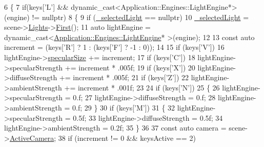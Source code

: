 \begin{DoxyCode}
6 \{
7     \textcolor{keywordflow}{if}(keys[\textcolor{charliteral}{'L'}] && dynamic\_cast<Application::Engines::LightEngine*>(engine) != \textcolor{keyword}{nullptr})
8     \{
9         \textcolor{keywordflow}{if} (\mbox{\hyperlink{classApplication_1_1Input_1_1Handlers_1_1LightingChangeInputHandler_a9d2d27b234fd09b3add304963534b719}{\_selectedLight}} == \textcolor{keyword}{nullptr})
10             \mbox{\hyperlink{classApplication_1_1Input_1_1Handlers_1_1LightingChangeInputHandler_a9d2d27b234fd09b3add304963534b719}{\_selectedLight}} = scene->\mbox{\hyperlink{classEngine_1_1Components_1_1Scene_a00f60de2f6c72242a7af0076a3b75e5e}{Lights}}->\mbox{\hyperlink{classGeneric_1_1Dictionary_ab368d54de28e7a3514e1add4bb5b3a36}{First}}();
11         \textcolor{keyword}{auto} lightEngine = \textcolor{keyword}{dynamic\_cast<}\mbox{\hyperlink{classApplication_1_1Engines_1_1LightEngine}{Application::Engines::LightEngine}}*\textcolor{keyword}{
      >}(engine);
12 
13         \textcolor{keyword}{const} \textcolor{keyword}{auto} increment = (keys[\textcolor{charliteral}{'R'}] ? 1 : (keys[\textcolor{charliteral}{'F'}] ? -1 : 0));
14 
15         \textcolor{keywordflow}{if} (keys[\textcolor{charliteral}{'V'}])
16             lightEngine->\mbox{\hyperlink{classApplication_1_1Engines_1_1LightEngine_a5da28beed5c8d278c3615974d464f246}{specularSize}} += increment;
17         \textcolor{keywordflow}{if} (keys[\textcolor{charliteral}{'C'}])
18             lightEngine->specularStrength += increment * .005f;
19         \textcolor{keywordflow}{if} (keys[\textcolor{charliteral}{'X'}])
20             lightEngine->diffuseStrength += increment * .005f;
21         \textcolor{keywordflow}{if} (keys[\textcolor{charliteral}{'Z'}])
22             lightEngine->ambientStrength += increment * .001f;
23 
24         \textcolor{keywordflow}{if} (keys[\textcolor{charliteral}{'N'}])
25         \{
26             lightEngine->specularStrength = 0.f;
27             lightEngine->diffuseStrength = 0.f;
28             lightEngine->ambientStrength = 0.f;
29         \}
30         \textcolor{keywordflow}{if} (keys[\textcolor{charliteral}{'M'}])
31         \{
32             lightEngine->specularStrength = 0.5f;
33             lightEngine->diffuseStrength = 0.5f;
34             lightEngine->ambientStrength = 0.2f;
35         \}
36 
37         \textcolor{keyword}{const} \textcolor{keyword}{auto} camera = scene->\mbox{\hyperlink{classEngine_1_1Components_1_1Scene_a9408befee37d89e2c001d25b9e4ed75a}{ActiveCamera}};
38         \textcolor{keywordflow}{if} (increment != 0 && keysActive == 2)

\end{DoxyCode}
